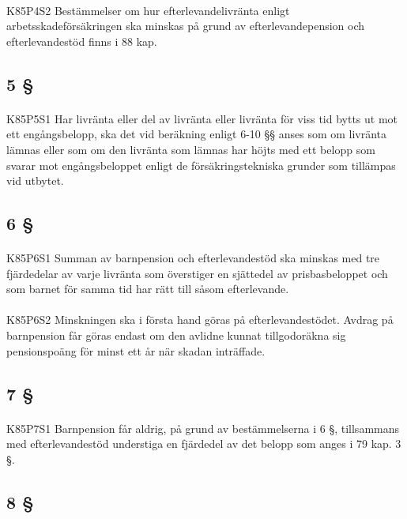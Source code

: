 \documentclass[a4paper,notitlepage,openany,10pt]{book}
\begin{document}
\paragraph*{}
{\tiny K85P4S2}
Bestämmelser om hur efterlevandelivränta enligt arbetsskadeförsäkringen ska minskas på grund av efterlevandepension och efterlevandestöd finns i 88 kap.
\subsection*{5 §}
\paragraph*{}
{\tiny K85P5S1}
Har livränta eller del av livränta eller livränta för viss tid bytts ut mot ett engångsbelopp, ska det vid beräkning enligt 6-10 §§ anses som om livränta lämnas eller som om den livränta som lämnas har höjts med ett belopp som svarar mot engångsbeloppet enligt de försäkringstekniska grunder som tillämpas vid utbytet.
\subsection*{6 §}
\paragraph*{}
{\tiny K85P6S1}
Summan av barnpension och efterlevandestöd ska minskas med tre fjärdedelar av varje livränta som överstiger en sjättedel av prisbasbeloppet och som barnet för samma tid har rätt till såsom efterlevande.
\paragraph*{}
{\tiny K85P6S2}
Minskningen ska i första hand göras på efterlevandestödet.
Avdrag på barnpension får göras endast om den avlidne kunnat tillgodoräkna sig pensionspoäng för minst ett år när skadan inträffade.
\subsection*{7 §}
\paragraph*{}
{\tiny K85P7S1}
Barnpension får aldrig, på grund av bestämmelserna i 6 §, tillsammans med efterlevandestöd understiga en fjärdedel av det belopp som anges i 79 kap. 3 §.
\subsection*{8 §}
\end{document}
